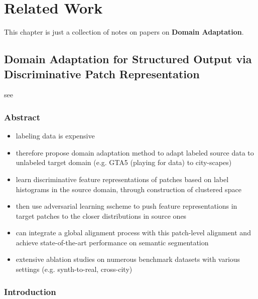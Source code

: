 \chapter{Related Work}
\label{sec:related_work}

This chapter is just a collection of notes on papers on \textbf{Domain Adaptation}.


\section{Domain Adaptation for Structured Output via Discriminative Patch Representation}

see \cite{Tsai2019DomainAF}

\subsection{Abstract}
\begin{itemize}
	\item labeling data is expensive
	\item therefore propose domain adaptation method to adapt labeled source data to unlabeled target domain (e.g. GTA5 (playing for data) to city-scapes)
	\item learn discriminative feature representations of patches based on label histograms in the source domain, through construction of clustered space
	\item then use adversarial learning sscheme to push feature representations in target patches to the closer distributions in source ones
	\item can integrate a global alignment process with this patch-level alignment and achieve state-of-the-art performance on semantic segmentation
	\item extensive ablation studies on numerous benchmark datasets with various settings (e.g. synth-to-real, cross-city)
\end{itemize}

\subsection{Introduction}

